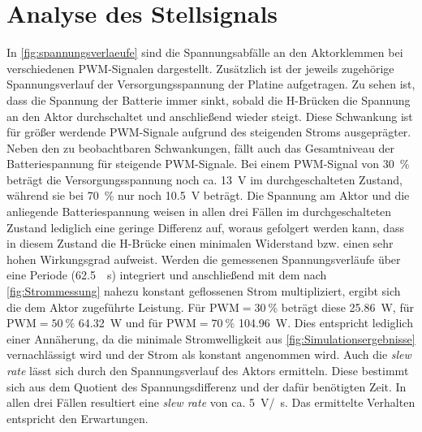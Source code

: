 \section{Analyse des Stellsignals}\label{sec:analyse_stellsignal}
In \autoref{fig:spannungsverlaeufe} sind die Spannungsabfälle an den Aktorklemmen bei verschiedenen PWM-Signalen dargestellt. Zusätzlich ist der jeweils zugehörige Spannungsverlauf der Versorgungsspannung der Platine aufgetragen. Zu sehen ist, dass die Spannung der Batterie immer sinkt, sobald die H-Brücken die Spannung an den Aktor durchschaltet und anschließend wieder steigt. Diese Schwankung ist für größer werdende PWM-Signale aufgrund des steigenden Stroms ausgeprägter. Neben den zu beobachtbaren Schwankungen, fällt auch das Gesamtniveau der Batteriespannung für steigende PWM-Signale. Bei einem PWM-Signal von \SI{30}{\%} beträgt die Versorgungsspannung noch ca. \SI{13}{V} im durchgeschalteten Zustand, während sie bei \SI{70}{\%} nur noch \SI{10,5}{V} beträgt. Die Spannung am Aktor und die anliegende Batteriespannung weisen in allen drei Fällen im durchgeschalteten Zustand lediglich eine geringe Differenz auf, woraus gefolgert werden kann, dass in diesem Zustand die H-Brücke einen minimalen Widerstand bzw. einen sehr hohen Wirkungsgrad aufweist. Werden die gemessenen Spannungsverläufe über eine Periode (\SI{62,5}{\mu s}) integriert und anschließend mit dem nach \autoref{fig:Strommessung} nahezu konstant geflossenen Strom multipliziert, ergibt sich die dem Aktor zugeführte Leistung. Für $\text{PWM}=\SI{30}{\%}$ beträgt diese \SI{25,86}{W}, für $\text{PWM}=\SI{50}{\%}$ \SI{64,32}{W} und für $\text{PWM}=\SI{70}{\%}$ \SI{104,96}{W}. Dies entspricht lediglich einer Annäherung, da die minimale Stromwelligkeit aus \autoref{fig:Simulationsergebnisse} vernachlässigt wird und der Strom als konstant angenommen wird.
Auch die \textit{slew rate} lässt sich durch den Spannungsverlauf des Aktors ermitteln. Diese bestimmt sich aus dem Quotient des Spannungsdifferenz und der dafür benötigten Zeit. In allen drei Fällen resultiert eine \textit{slew rate} von ca. \SI{5}{V/\mu s}. Das ermittelte Verhalten entspricht den Erwartungen.


